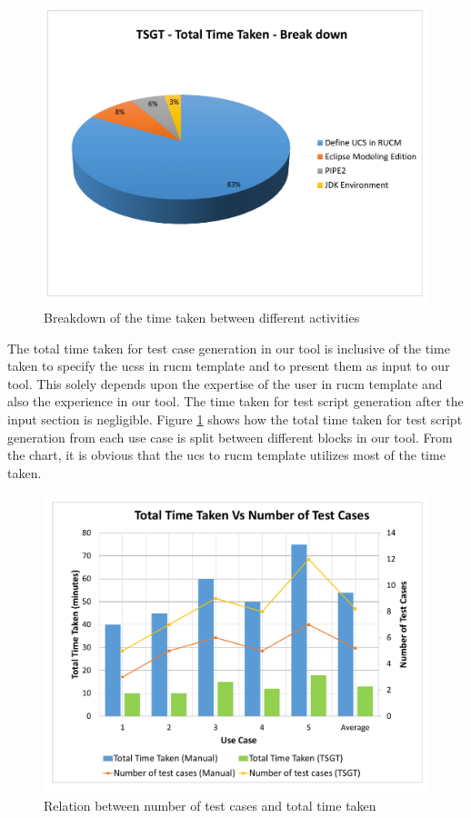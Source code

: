 \begin{figure}[htb!]
\centering
\includegraphics[scale=0.45]{content/images/Chapter6/figure4.pdf}
\caption{Breakdown of the time taken between different activities}
\label{fig:chap6fig4}
\end{figure}


The total time taken for test case generation in our tool is inclusive of the time taken to specify the \glspl{ucs} in \gls{rucm} template and to present them as input to our tool. This solely depends upon the expertise of the user in \gls{rucm} template and also the experience in our tool. The time taken for test script generation after the input section is negligible. Figure \ref{fig:chap6fig4} shows how the total time taken for test script generation from each use case is split between different blocks in our tool. From the chart, it is obvious that the \gls{ucs} to \gls{rucm} template utilizes most of the time taken.


\begin{figure}[htb!]
\centering
\includegraphics[scale=0.45]{content/images/Chapter6/figure5.pdf}
\caption{Relation between number of test cases and total time taken}
\label{fig:chap6fig5}
\end{figure}

